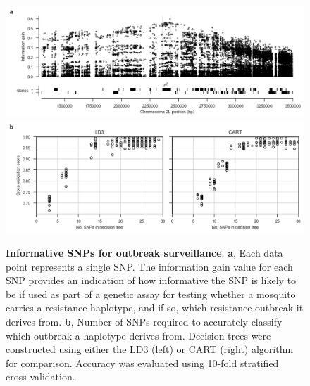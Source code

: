 \documentclass[a4paper,11pt,abstracton,hidelinks]{scrartcl}
\begin{document}
%
\begin{figure}[!b]
  \centering
  
  \includegraphics[width=1.0\linewidth]{artwork/info_gain.png}
  \includegraphics[width=1.0\linewidth]{artwork/tree_cv.png}
  
  \caption{%
%
\textbf{Informative SNPs for outbreak surveillance}. 
%
\textbf{a}, Each data point represents a single SNP. 
%
The information gain value for each SNP provides an indication of how informative the SNP is likely to be if used as part of a genetic assay for testing whether a mosquito carries a resistance haplotype, and if so, which resistance outbreak it derives from. 
%
\textbf{b}, Number of SNPs required to accurately classify which outbreak a haplotype derives from. 
%
Decision trees were constructed using either the LD3 (left) or CART (right) algorithm for comparison.
%
Accuracy was evaluated using 10-fold stratified cross-validation.
}

  \label{fig:gain}
\end{figure}
\end{document}
